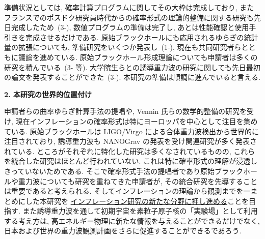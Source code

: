 \documentclass[11pt,a4paper,uplatex,dvipdfmx]{ujarticle} 		%
\newcommand{\研究課題名}{確率解析・原始ブラックホール・重力波観測から迫るインフレーション}
\newcommand{\研究機関名}{名古屋大学}
\newcommand{\研究代表者氏名}{多田祐一郎}
\newcommand{\研究期間の最終元号年度}{6}  %
\begin{document}
準備状況としては, 確率計算プログラムに関してその大枠は完成しており, 
またフランスでのポスドク研究員時代からの確率形式の理論的整備に関する研究も先日完成したため~(3-\cite{Pinol:2018euk,Pinol:2020cdp}),
数値プログラムの準備は完了し, あとは性能確認と使用手引きを完成させるだけである.
原始ブラックホールにも応用されるゆらぎの統計量の拡張についても, 準備研究をいくつか発表し~(1-\cite{Tada:2016pmk,Suyama:2020akr}),
現在も共同研究者らとともに議論を進めている.
原始ブラックホール形成理論についても申請者は多くの研究を積んでいる~(3-\cite{Kawasaki:2016pql,Inomata:2016rbd,Inomata:2017okj,Inomata:2017uaw} 等).
大学院生らとの誘導重力波の研究に関しても先日最初の論文を発表することができた~(3-\cite{Abe:2020sqb}).
本研究の準備は順調に進んでいると言える.


\begin{mdframed}[roundcorner=0.5zw,
	innertopmargin=0.8zw,innerbottommargin=0.8zw,
	linecolor=black!50,linewidth=0.2zw,
	backgroundcolor=black!10]
	{\bfseries\gtfamily\sffamily\large 2. 本研究の世界的位置付け}
\end{mdframed}

\noindent
申請者らの曲率ゆらぎ計算手法の提唱や, Vennin 氏らの数学的整備の研究を受け, 現在インフレーションの確率形式は特にヨーロッパを中心として注目を集めている.
原始ブラックホールは LIGO/Virgo による合体重力波検出から世界的に注目されており, 誘導重力波も NANOGrav の発表を受け関連研究が多く発表されている.
ところがそれぞれに特化した研究は多くなされているものの, これらを統合した研究はほとんど行われていない.
これは特に確率形式の理解が浸透しきっていないためである.
そこで確率形式手法の提唱者であり原始ブラックホールや重力波についても研究を重ねてきた申請者が, 
その統合研究を先導することは重要であると考えられる.
そしてインフレーションの理論から観測までを一まとめにした本研究を
\ul{インフレーション研究の新たな分野に押し進める}ことを目指す.
また誘導重力波を通して初期宇宙を素粒子原子核の「実験場」として利用する考え方は,
高エネルギー物理に新たな情報を与えることができるだけでなく,
日本および世界の重力波観測計画をさらに促進することができるであろう.




\bigskip
\end{document}
